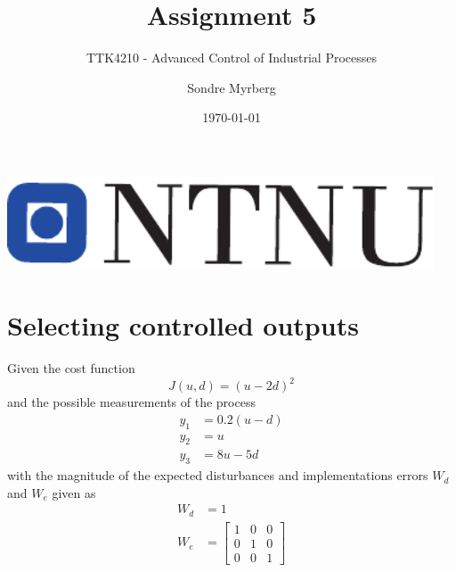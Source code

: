 \documentclass[a4paper]{scrartcl}
\title{Assignment 5}
\subtitle{TTK4210 - Advanced Control of Industrial Processes}
\author{Sondre Myrberg}
\date{\today}
\begin{document}
\hypersetup{pageanchor=false}
\begin{titlepage}
    \maketitle
    \vfill
    \vfill
    \vfill
    \vfill
    \vfill
    \includegraphics[width=0.95\textwidth]{../ntnu_logo.pdf}
    \vfill
    \vfill
\end{titlepage}
\hypersetup{pageanchor=true}

\section{Selecting controlled outputs}

Given the cost function
\begin{equation}
	J(u,d) = (u-2d)^2
\end{equation}
and the possible measurements of the process
\begin{equation}
	\begin{aligned}
		y_1 &= 0.2(u-d)\\
		y_2 &= u\\
		y_3 &= 8u - 5d
	\end{aligned}
\end{equation}
with the magnitude of the expected disturbances and implementations errors $W_d$ and $W_e$ given as
\begin{equation}
	\begin{aligned}
		W_d &= 1\\
		W_e &= \begin{bmatrix}
			1 & 0 & 0\\
			0 & 1 & 0\\
			0 & 0 & 1
		\end{bmatrix}
	\end{aligned}
\end{equation}

\subsection{}
\end{document}
